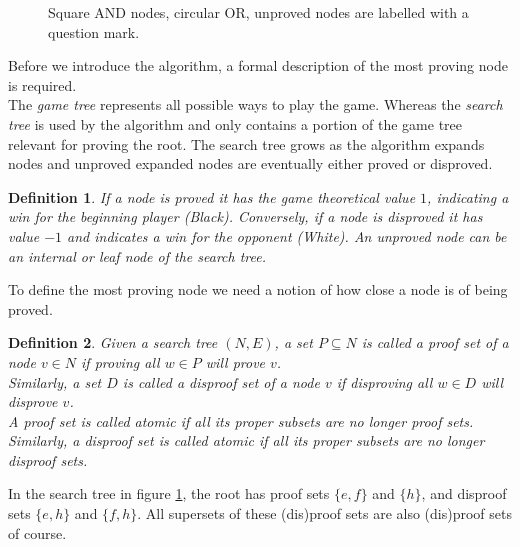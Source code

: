\documentclass{article}
\newtheorem{mydef}{Definition}
\begin{document}
\begin{figure}[h]
\center
{}
\caption{Square AND nodes, circular OR, unproved nodes are labelled with a question mark.}
\label{tree:pnex}
\end{figure}

Before we introduce the algorithm, a formal description of the most proving node is required.\\
The \textit{game tree} represents all possible ways to play the game. Whereas the \textit{search tree} is used by the algorithm
and only contains a portion of the game tree relevant for proving the root. The search tree grows as the algorithm expands nodes and
unproved expanded nodes are eventually either proved or disproved.
\begin{mydef}
If a node is proved it has the game theoretical value $1$, indicating a win for the beginning player (Black).
Conversely, if a node is disproved it has value $-1$ and indicates a win for the opponent (White).
An unproved node can be an internal or leaf node of the search tree.
\end{mydef}

To define the most proving node we need a notion of how close a node is of being proved.
\begin{mydef}
Given a search tree $(N, E)$, a set $P \subseteq N$ is called a proof set of a node $v \in N$ if proving all $w \in P$ will prove $v$.\\
Similarly, a set $D$ is called a disproof set of a node $v$ if disproving all $w \in D$ will disprove $v$.\\
A proof set is called atomic if all its proper subsets are no longer proof sets.\\
Similarly, a disproof set is called atomic if all its proper subsets are no longer disproof sets.
\end{mydef}
In the search tree in figure \ref{tree:pnex}, the root has proof sets $\{e, f\}$ and $\{h\}$,
and  disproof sets $\{e, h\}$ and $\{f, h\}$. All supersets of these (dis)proof sets are also (dis)proof sets of course.
\end{document}
